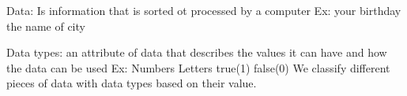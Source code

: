 Data:
  Is information that is sorted ot processed by a computer 
  Ex: 
    your birthday 
    the name of city 

Data types: 
  an attribute of data that describes the values it can have and how the data can be used 
  Ex: 
    Numbers 
    Letters 
    true(1)
    false(0)
  We classify different pieces of data with data types based on their value. 